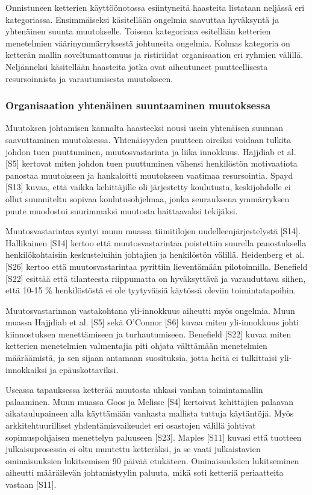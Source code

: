 Onnistuneen ketterien käyttöönotossa esiintyneitä haasteita listataan neljässä
eri kategoriassa. Ensimmäiseksi käsitellään ongelmia saavuttaa hyväksyntä ja
yhtenäinen suunta muutokselle. Toisena kategoriana esitellään ketterien
menetelmien väärinymmärryksestä johtuneita ongelmia. Kolmas kategoria on
ketterän mallin soveltumattomuus ja ristiriidat organisaation eri ryhmien
välillä. Neljänneksi käsitellään haasteita jotka ovat aiheutuneet
puutteellisesta resursoinnista ja varautumisesta muutokseen.

\subsubsection{Organisaation yhtenäinen suuntaaminen muutoksessa}

Muutoksen johtamisen kannalta haasteeksi nousi usein yhtenäisen suunnan
saavuttaminen muutoksessa. Yhtenäisyyden puutteen oireiksi voidaan tulkita
johdon tuen puuttuminen, muutosvastarinta ja liika innokkuus. Hajjdiab et al.
[S5] kertovat miten johdon tuen puuttuminen vähensi henkilöstön motivaatiota
panostaa muutokseen ja hankaloitti muutokseen vaatimaa resursointia. Spayd [S13]
kuvaa, että vaikka kehittäjille oli järjestetty koulutusta, keskijohdolle ei
ollut suunniteltu sopivaa koulutusohjelmaa, jonka seurauksena ymmärryksen
puute muodostui suurimmaksi muutosta haittaavaksi tekijäksi.

Muutosvastarintaa syntyi muun muassa tiimitilojen uudelleenjärjestelystä [S14].
Hallikainen [S14] kertoo että muutosvastarintaa poistettiin suurella
panostuksella henkilökohtaisiin keskusteluihin johtajien ja henkilöstön välillä.
Heidenberg et al. [S26] kertoo että muutosvastarintaa pyrittiin lieventämään
pilotoinnilla. Benefield [S22] esittää että tilanteesta riippumatta on
hyväksyttävä ja varauduttava siihen, että 10-15 \% henkilöstöstä ei ole
tyytyväisiä käytössä oleviin toimintatapoihin.

Muutosvastarinnan vastakohtana yli-innokkuus aiheutti myös ongelmia. Muun muassa
Hajjdiab et al. [S5] sekä O'Connor [S6] kuvaa miten yli-innokkuus johti 
kiinnostuksen menettämiseen ja turhautumiseen. Benefield [S22] kuvaa miten
ketterien menetelmien valmentajia piti ohjata välttämään menetelmien
määräämistä, ja sen sijaan antamaan suosituksia, jotta heitä ei tulkittaisi
yli-innokkaiksi ja epäuskottaviksi.

Useassa tapauksessa ketterää muutosta uhkasi vanhan toimintamallin palaaminen.
Muun muassa Goos ja Melisse [S4] kertoivat kehittäjien palaavan
aikataulupaineen alla käyttämään vanhasta mallista tuttuja käytäntöjä. Myös
arkkitehtuurilliset yhdentämisvaikeudet eri osastojen välillä johtivat
sopimuspohjaisen menettelyn paluuseen [S23]. Maples [S11] kuvasi että tuotteen
julkaisuprosessia ei oltu muutettu ketteräksi, ja se vaati julkaistavien
ominaisuuksien lukitsemisen 90 päivää etukäteen. Ominaisuuksien lukitseminen
aiheutti määräilevän johtamistyylin paluuta, mikä soti ketteriä periaatteita
vastaan [S11].

